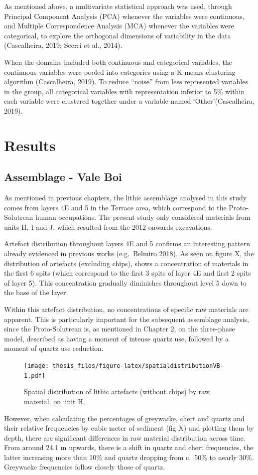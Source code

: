 \documentclass[12pt,twoside]{reedthesis}
\begin{document}
As mentioned above, a multivariate statistical approach was used, through Principal Component Analysis (PCA) whenever the variables were continuous, and Multiple Correspondence Analysis (MCA) whenever the variables were categorical, to explore the orthogonal dimensions of variability in the data (Cascalheira, 2019; Scerri et al., 2014).

When the domains included both continuous and categorical variables, the continuous variables were pooled into categories using a K-means clustering algorithm (Cascalheira, 2019). To reduce ``noise'' from less represented variables in the group, all categorical variables with representation inferior to 5\% within each variable were clustered together under a variable named `Other'(Cascalheira, 2019).

\hypertarget{results}{%
\chapter{Results}\label{results}}

\hypertarget{assemblage---vale-boi}{%
\section{Assemblage - Vale Boi}\label{assemblage---vale-boi}}

As mentioned in previous chapters, the lithic assemblage analysed in this study comes from layers 4E and 5 in the Terrace area, which correspond to the Proto-Solutrean human occupations. The present study only considered materials from units H, I and J, which resulted from the 2012 onwards excavations.

Artefact distribution throughout layers 4E and 5 confirms an interesting pattern already evidenced in previous works (e.g.~Belmiro 2018). As seen on figure X, the distribution of artefacts (excluding chips), shows a concentration of materials in the first 6 spits (which correspond to the first 3 spits of layer 4E and first 2 spits of layer 5). This concentration gradually diminishes throughout level 5 down to the base of the layer.

Within this artefact distribution, no concentrations of specific raw materials are apparent. This is particularly important for the subsequent assemblage analysis, since the Proto-Solutrean is, as mentioned in Chapter 2, on the three-phase model, described as having a moment of intense quartz use, followed by a moment of quartz use reduction.
\begin{figure}
\centering
\texttt{[image: thesis\_files/figure-latex/spatialdistributionVB-1.pdf]}
\caption{\label{fig:spatialdistributionVB}Spatial distribution of lithic artefacts (without chips) by raw material, on unit H.}
\end{figure}
However, when calculating the percentages of greywacke, chert and quartz and their relative frequencies by cubic meter of sediment (fig X) and plotting them by depth, there are significant differences in raw material distribution across time. From around 24.1 m upwards, there is a shift in quartz and chert frequencies, the latter increasing more than 10\% and quartz dropping from c.~50\% to nearly 30\%. Greywacke frequencies follow closely those of quartz.
\end{document}
